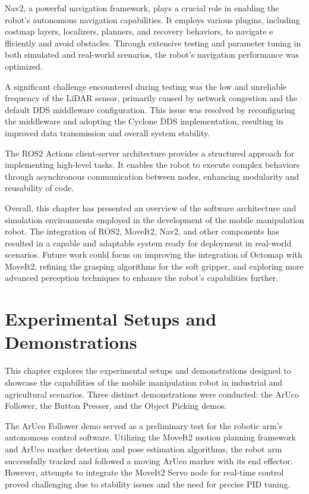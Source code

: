 Nav2, a powerful navigation framework, plays a crucial role in enabling the robot's autonomous navigation capabilities.
It employs various plugins, including costmap layers, localizers, planners, and recovery behaviors, to navigate e
fficiently and avoid obstacles. Through extensive testing and parameter tuning in both simulated and real-world scenarios,
the robot's navigation performance was optimized.

A significant challenge encountered during testing was the low and unreliable frequency of the LiDAR sensor, 
primarily caused by network congestion and the default DDS middleware configuration. This issue was resolved by 
reconfiguring the middleware and adopting the Cyclone DDS implementation, resulting in improved data transmission
and overall system stability.

The ROS2 Actions client-server architecture provides a structured approach for implementing high-level tasks. 
It enables the robot to execute complex behaviors through asynchronous communication between nodes, enhancing 
modularity and reusability of code.

Overall, this chapter has presented an overview of the software architecture and simulation environments employed 
in the development of the mobile manipulation robot. The integration of ROS2, MoveIt2, Nav2, and other components 
has resulted in a capable and adaptable system ready for deployment in real-world scenarios. Future work could focus
on improving the integration of Octomap with MoveIt2, refining the grasping algorithms for the soft gripper, 
and exploring more advanced perception techniques to enhance the robot's capabilities further.

\section{Experimental Setups and Demonstrations}

This chapter explores the experimental setups and demonstrations designed to showcase the capabilities of the 
mobile manipulation robot in industrial and agricultural scenarios. Three distinct demonstrations were conducted:
the ArUco Follower, the Button Presser, and the Object Picking demos.

The ArUco Follower demo served as a preliminary test for the robotic arm's autonomous control software. 
Utilizing the MoveIt2 motion planning framework and ArUco marker detection and pose estimation algorithms, 
the robot arm successfully tracked and followed a moving ArUco marker with its end effector.  However, 
attempts to integrate the MoveIt2 Servo node for real-time control proved challenging due to stability issues
and the need for precise PID tuning.

